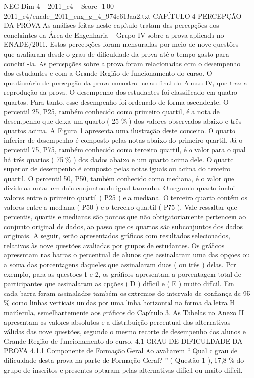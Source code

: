 \begin{textsample}{NEG Dim 4 – 2011\_c4 – Score -1.00 – 2011\_c4/enade\_2011\_eng\_g\_4\_974c613aa2.txt}  \label{ex:f4_neg_122}
CAPÍTULO 4 PERCEPÇÃO DA PROVA As análises feitas neste capítulo tratam das percepções dos concluintes da Área de Engenharia – Grupo IV sobre a prova aplicada no ENADE/2011.
Estas percepções foram mensuradas por meio de nove questões que avaliaram desde o grau de dificuldade da prova até o tempo gasto para concluí -la.
As percepções sobre a prova foram relacionadas com o desempenho dos estudantes e com a Grande Região de funcionamento do curso.
O questionário de percepção da prova encontra -se ao final do Anexo IV, que traz a reprodução da prova.
O desempenho dos estudantes foi classificado em quatro quartos.
Para tanto, esse desempenho foi ordenado de forma ascendente.
O percentil 25, P25, também conhecido como primeiro quartil, é a nota de desempenho que deixa um quarto ( 25 \% ) dos valores observados abaixo e três quartos acima.
A Figura 1 apresenta uma ilustração deste conceito.
O quarto inferior de desempenho é composto pelas notas abaixo do primeiro quartil.
Já o percentil 75, P75, também conhecido como terceiro quartil, é o valor para o qual há três quartos ( 75 \% ) dos dados abaixo e um quarto acima dele.
O quarto superior de desempenho é composto pelas notas iguais ou acima do terceiro quartil.
O percentil 50, P50, também conhecido como mediana, é o valor que divide as notas em dois conjuntos de igual tamanho.
O segundo quarto inclui valores entre o primeiro quartil ( P25 ) e a mediana.
O terceiro quarto contém os valores entre a mediana ( P50 ) e o terceiro quartil ( P75 ).
Vale ressaltar que percentis, quartis e medianas são pontos que não obrigatoriamente pertencem ao conjunto original de dados, ao passo que os quartos são subconjuntos dos dados originais.
A seguir, serão apresentados gráficos com resultados selecionados, relativos às nove questões avaliadas por grupos de estudantes.
Os gráficos apresentam nas barras o percentual de alunos que assinalaram uma das opções ou a soma das porcentagens daqueles que assinalaram duas ( ou três ) delas.
Por exemplo, para as questões 1 e 2, os gráficos apresentam a porcentagem total de participantes que assinalaram as opções ( D ) difícil e ( E ) muito difícil.
Em cada barra foram assinalados também os extremos do intervalo de confiança de 95 \% como linhas verticais unidas por uma linha horizontal na forma da letra H maiúscula, semelhantemente aos gráficos do Capítulo 3.
As Tabelas no Anexo II apresentam os valores absolutos e a distribuição percentual das alternativas válidas das nove questões, segundo o mesmo recorte de desempenho dos alunos e Grande Região de funcionamento do curso. 4.1 GRAU DE DIFICULDADE DA PROVA 4.1.1 Componente de Formação Geral Ao avaliarem “ Qual o grau de dificuldade desta prova na parte de Formação Geral? ” ( Questão 1 ), 17,8 \% do grupo de inscritos e presentes optaram pelas alternativas difícil ou muito difícil.

\end{textsample}
